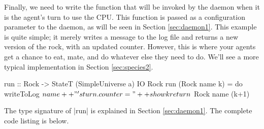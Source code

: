Finally, we need to write the function that will be
invoked by the daemon when it is the agent's turn to use the CPU.
This function is passed as a configuration parameter to the daemon,
as will be seen in Section \ref{sec:daemon1}.
This example is quite simple;
it merely writes a message to the log file
and returns a new version of the rock, with an updated counter.
However, this is where your agents get a chance to eat, mate, 
and do whatever else they need to do.
We'll see a more typical implementation in Section
\ref{sec:species2}.

\begin{code}
run :: Rock -> StateT (SimpleUniverse a) IO Rock
run (Rock name k) = do
  writeToLog $ name ++ "'s turn. counter=" ++ show k 
  return $ Rock name (k+1)
\end{code}

The type signature of |run| is explained in Section \ref{sec:daemon1}.
The complete code listing is below.
\label{code:rock}

